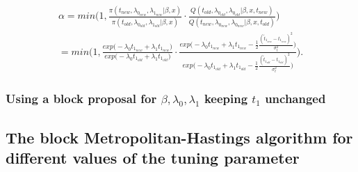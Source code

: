 \begin{align}
    \alpha = min \Bigg(1,  \frac{
    \pi(t_{new}, \lambda_{0_{new}}, \lambda_{1_{new}}|\beta, x)}{\pi(t_{old}, \lambda_{0_{old}}, \lambda_{1_{old}}|\beta, x)}
    \cdot 
    \frac{Q(t_{old}, \lambda_{0_{old}}, \lambda_{0_{old}} | \beta, x, t_{new})}{Q(t_{new}, \lambda_{0_{new}}, \lambda_{0_{new}} | \beta, x, t_{old})} \Bigg) \\
    = min \Bigg(1, \frac{ exp \Big( -\lambda_0t_{1_{new}} +\lambda_1t_{1_{new}}  \Big)}{ exp \Big( -\lambda_0t_{1_{old}} +\lambda_1t_{1_{old}} \Big)} 
    \cdot \frac{ exp \Big(  -\lambda_0 t_{1_{new}} + \lambda_1 t_{1_{new}}   -\frac{1}{2} \frac{(\widetilde{t}_{1_{new}}-t_{1_{new}})^2}{\sigma_t^2} \Big)}{ exp \Big(  -\lambda_0 t_{1_{old}}  + \lambda_1 t_{1_{old}}  -\frac{1}{2} \frac{(\widetilde{t}_{1_{old}}-t_{1_{old}})^2}{\sigma_t^2} \Big)}   \Bigg).
\end{align}




\subsubsection{Using a block proposal for $\beta, \lambda_0, \lambda_1$ keeping $t_1$ unchanged}










\subsection{The block Metropolitan-Hastings algorithm for different values of the tuning parameter}

